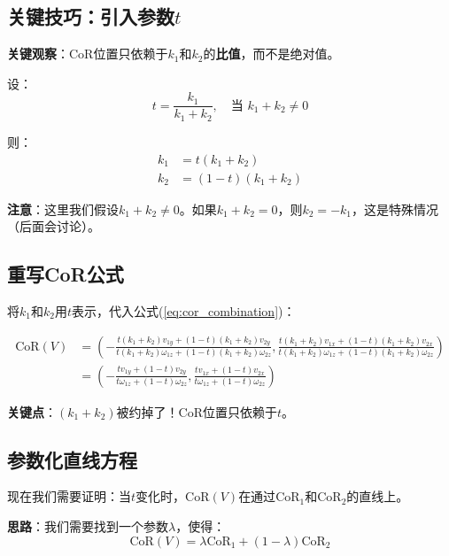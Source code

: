 \documentclass[12pt,a4paper]{article}
\begin{document}
\subsection{关键技巧：引入参数$t$}

\textbf{关键观察}：CoR位置只依赖于$k_1$和$k_2$的\textbf{比值}，而不是绝对值。

设：
\begin{equation}
t = \frac{k_1}{k_1 + k_2}, \quad \text{当 } k_1 + k_2 \neq 0
\end{equation}

则：
\begin{align}
k_1 &= t(k_1 + k_2) \\
k_2 &= (1-t)(k_1 + k_2)
\end{align}

\textbf{注意}：这里我们假设$k_1 + k_2 \neq 0$。如果$k_1 + k_2 = 0$，则$k_2 = -k_1$，这是特殊情况（后面会讨论）。

\subsection{重写CoR公式}

将$k_1$和$k_2$用$t$表示，代入公式(\ref{eq:cor_combination})：

\begin{align}
\text{CoR}(V) &= \left(-\frac{t(k_1+k_2) v_{1y} + (1-t)(k_1+k_2) v_{2y}}{t(k_1+k_2) \omega_{1z} + (1-t)(k_1+k_2) \omega_{2z}}, \frac{t(k_1+k_2) v_{1x} + (1-t)(k_1+k_2) v_{2x}}{t(k_1+k_2) \omega_{1z} + (1-t)(k_1+k_2) \omega_{2z}}\right) \\
&= \left(-\frac{t v_{1y} + (1-t) v_{2y}}{t \omega_{1z} + (1-t) \omega_{2z}}, \frac{t v_{1x} + (1-t) v_{2x}}{t \omega_{1z} + (1-t) \omega_{2z}}\right)
\label{eq:cor_t}
\end{align}

\textbf{关键点}：$(k_1 + k_2)$被约掉了！CoR位置只依赖于$t$。

\subsection{参数化直线方程}

现在我们需要证明：当$t$变化时，$\text{CoR}(V)$在通过$\text{CoR}_1$和$\text{CoR}_2$的直线上。

\textbf{思路}：我们需要找到一个参数$\lambda$，使得：
\begin{equation}
\text{CoR}(V) = \lambda \text{CoR}_1 + (1-\lambda) \text{CoR}_2
\end{equation}
\end{document}
